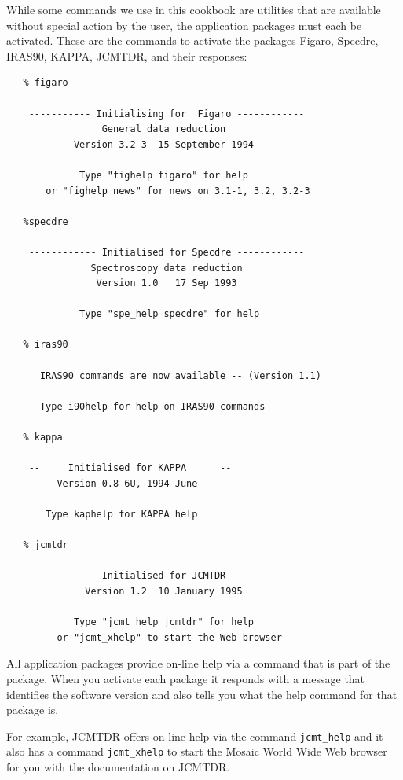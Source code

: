 \documentclass[11pt]{article}
\newcommand{\htmladdnormallink}[2]{#1}
\newcommand{\xref}[3]{#1}
\begin{document}
   While some commands we use in this cookbook are utilities that are
   available without special action by the user, the application packages
   must each be activated. These are the commands to activate the
   packages
\xref{Figaro,}{sun86}{}
\xref{Specdre,}{sun140}{}
\xref{IRAS90,}{sun163}{}
\xref{KAPPA,}{sun95}{}
\xref{JCMTDR,}{sun132}{}
 and their responses:

\begin{verbatim}
   % figaro

    ----------- Initialising for  Figaro ------------
                 General data reduction
            Version 3.2-3  15 September 1994

             Type "fighelp figaro" for help
       or "fighelp news" for news on 3.1-1, 3.2, 3.2-3

   %specdre

    ------------ Initialised for Specdre ------------
               Spectroscopy data reduction
                Version 1.0   17 Sep 1993

             Type "spe_help specdre" for help

   % iras90

      IRAS90 commands are now available -- (Version 1.1)

      Type i90help for help on IRAS90 commands

   % kappa

    --     Initialised for KAPPA      --
    --   Version 0.8-6U, 1994 June    --

       Type kaphelp for KAPPA help

   % jcmtdr

    ------------ Initialised for JCMTDR ------------
              Version 1.2  10 January 1995

            Type "jcmt_help jcmtdr" for help
         or "jcmt_xhelp" to start the Web browser
\end{verbatim}

   All application packages provide on-line help via a command that is
   part of the package. When you activate each package
   it responds with a message that identifies the software version and
   also tells you what the help command for that package is.

   For example, JCMTDR offers on-line help via the command
{\tt \xref{jcmt\_help}{sun132}{JCMT_HELP}}
   and it also has a command
{\tt \xref{jcmt\_xhelp}{sun132}{JCMT_XHELP}}
   to start the
\xref{Mosaic}{sun175}{}
\htmladdnormallink{World Wide Web}{http://www.w3.org/hypertext/WWW/TheProject.html}
   browser for you with the
\xref{documentation on JCMTDR.}{sun132}{}
\end{document}
